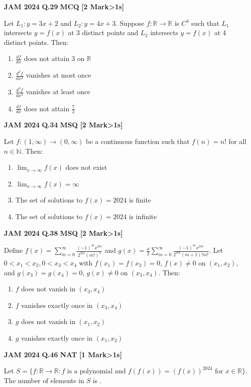 \documentclass[11pt,a4paper]{article}
\newcommand{\pyqheader}[4]{%
    \noindent\begin{tcolorbox}[
        colback=badgebg,
        colframe=secondary,
        arc=2mm,
        boxrule=0.6pt,
        top=1.5mm,bottom=1.5mm,left=2mm,right=2mm
    ]
        \textbf{\textcolor{primary}{JAM #1}} \hfill \textbf{Q.#2} \hfill \textsc{\textbf{#3}} \hfill \textbf{[#4 Mark\ifnum#4>1s\fi]}
    \end{tcolorbox}\vspace{-1mm}
}
\begin{document}
\pyqheader{2024}{29}{MCQ}{2}
Let $L_{1}: y=3x+2$ and $L_{2}: y=4x+3$. Suppose $f:\mathbb{R}\rightarrow\mathbb{R}$ is $C^{4}$ such that $L_{1}$ intersects $y=f(x)$ at 3 distinct points and $L_{2}$ intersects $y=f(x)$ at 4 distinct points. Then:
\begin{enumerate}[label=(\Alph*)]
    \item $\frac{df}{dx}$ does not attain 3 on $\mathbb{R}$
    \item $\frac{d^{2}f}{dx^{2}}$ vanishes at most once
    \item $\frac{d^{3}f}{dx^{3}}$ vanishes at least once
    \item $\frac{df}{dx}$ does not attain $\frac{7}{2}$
\end{enumerate}

\pyqheader{2024}{34}{MSQ}{2}
Let $f:(1,\infty)\rightarrow(0,\infty)$ be a continuous function such that $f(n)=n!$ for all $n\in\mathbb{N}$. Then:
\begin{enumerate}[label=(\Alph*)]
    \item $\lim_{x\rightarrow\infty}f(x)$ does not exist
    \item $\lim_{x\rightarrow\infty}f(x)=\infty$
    \item The set of solutions to $f(x)=2024$ is finite
    \item The set of solutions to $f(x)=2024$ is infinite
\end{enumerate}

\pyqheader{2024}{38}{MSQ}{2}
Define $f(x)=\sum_{m=0}^{\infty}\frac{(-1)^{m}x^{2m}}{2^{2m}(m!)^{2}}$ and $g(x)=\frac{x}{2}\sum_{m=0}^{\infty}\frac{(-1)^{m}x^{2m}}{2^{2m}(m+1)!m!}$. Let $0<x_{1}<x_{2}, 0<x_{3}<x_{4}$ with $f(x_{1})=f(x_{2})=0$, $f(x)\ne 0$ on $(x_1,x_2)$, and $g(x_3)=g(x_4)=0$, $g(x)\ne 0$ on $(x_3,x_4)$. Then:
\begin{enumerate}[label=(\Alph*)]
    \item $f$ does not vanish in $(x_3,x_4)$
    \item $f$ vanishes exactly once in $(x_3,x_4)$
    \item $g$ does not vanish in $(x_1,x_2)$
    \item $g$ vanishes exactly once in $(x_1,x_2)$
\end{enumerate}

\pyqheader{2024}{46}{NAT}{1}
Let $S=\{f:\mathbb{R}\rightarrow\mathbb{R}: f \text{ is a polynomial and } f(f(x))=(f(x))^{2024} \text{ for } x\in\mathbb{R}\}$. The number of elements in $S$ is \underline{\hspace{1.5cm}}.
\end{document}
